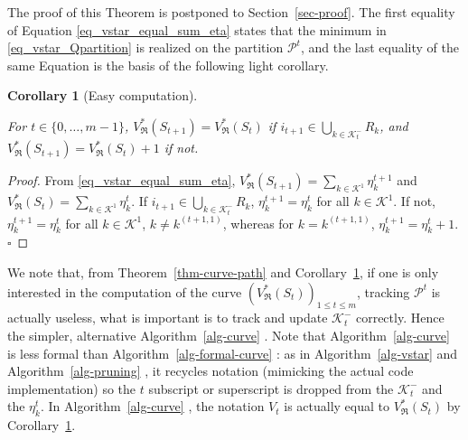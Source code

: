 \documentclass[
  11pt,
  a4paper,
]{article}
\theoremstyle{plain}
\theoremstyle{plain}
\newtheorem{corollary}{Corollary}[section]
\theoremstyle{plain}
\theoremstyle{definition}
\theoremstyle{definition}
\theoremstyle{remark}
\begin{document}
The proof of this Theorem is postponed to Section~\ref{sec-proof}. The
first equality of Equation \eqref{eq_vstar_equal_sum_eta} states that
the minimum in \eqref{eq_vstar_Qpartition} is realized on the partition
\(\mathcal{P}^t\), and the last equality of the same Equation is the
basis of the following light corollary.

\begin{corollary}[Easy
computation]\protect\hypertarget{cor-easy-impl}{}\label{cor-easy-impl}

For \(t\in\{0,\dotsc, m-1 \}\),
\(V^*_{\mathfrak{R}}(S_{t+1})=V^*_{\mathfrak{R}}(S_{t})\) if
\(i_{t+1}\in \bigcup_{k\in\mathcal{K}^-_t}R_k\), and
\(V^*_{\mathfrak{R}}(S_{t+1})=V^*_{\mathfrak{R}}(S_{t}) + 1\) if not.

\end{corollary}

\begin{proof}
From \eqref{eq_vstar_equal_sum_eta},
\(V^*_{\mathfrak{R}}(S_{t+1})=\sum_{k\in\mathcal{K}^1} \eta_k^{t+1}\)
and \(V^*_{\mathfrak{R}}(S_{t})=\sum_{k\in\mathcal{K}^1} \eta_k^{t}\).
If \(i_{t+1}\in \bigcup_{k\in\mathcal{K}^-_t}R_k\),
\(\eta_k^{t+1}=\eta_k^{t}\) for all \(k\in\mathcal{K}^1\). If not,
\(\eta_k^{t+1}=\eta_k^{t}\) for all \(k\in\mathcal{K}^1\),
\(k\neq k^{(t+1,1)}\), whereas for \(k= k^{(t+1,1)}\),
\(\eta_k^{t+1}=\eta_k^{t}+1\). \(\square\)
\end{proof}

We note that, from Theorem~\ref{thm-curve-path} and
Corollary~\ref{cor-easy-impl}, if one is only interested in the
computation of the curve
\(\left(V^*_{\mathfrak{R}}(S_{t})\right)_{1\leq t\leq m}\), tracking
\(\mathcal{P}^t\) is actually useless, what is important is to track and
update \(\mathcal{K}^-_t\) correctly. Hence the simpler, alternative
 Algorithm~\ref{alg-curve} . Note that  Algorithm~\ref{alg-curve}  is
less formal than  Algorithm~\ref{alg-formal-curve} : as in
 Algorithm~\ref{alg-vstar}  and  Algorithm~\ref{alg-pruning} , it
recycles notation (mimicking the actual code implementation) so the
\(t\) subscript or superscript is dropped from the \(\mathcal{K}^-_t\)
and the \(\eta_k^t\). In  Algorithm~\ref{alg-curve} , the notation
\(V_t\) is actually equal to \(V^*_{\mathfrak{R}}(S_{t})\) by
Corollary~\ref{cor-easy-impl}.
\end{document}
